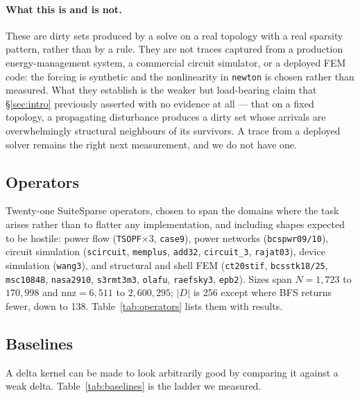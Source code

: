 \documentclass{article}
\begin{document}
\paragraph{What this is and is not.} These are dirty sets produced by a solve on
a real topology with a real sparsity pattern, rather than by a rule. They are
not traces captured from a production energy-management system, a commercial
circuit simulator, or a deployed FEM code: the forcing is synthetic and the
nonlinearity in \texttt{newton} is chosen rather than measured. What they
establish is the weaker but load-bearing claim that \S\ref{sec:intro} previously
asserted with no evidence at all --- that on a fixed topology, a propagating
disturbance produces a dirty set whose arrivals are overwhelmingly structural
neighbours of its survivors. A trace from a deployed solver remains the right
next measurement, and we do not have one.

\subsection{Operators}

Twenty-one SuiteSparse operators, chosen to span the domains where the task
arises rather than to flatter any implementation, and including shapes expected
to be hostile: power flow (\texttt{TSOPF}$\times 3$, \texttt{case9}), power
networks (\texttt{bcspwr09/10}), circuit simulation (\texttt{scircuit},
\texttt{memplus}, \texttt{add32}, \texttt{circuit\_3}, \texttt{rajat03}), device
simulation (\texttt{wang3}), and structural and shell FEM (\texttt{ct20stif},
\texttt{bcsstk18/25}, \texttt{msc10848}, \texttt{nasa2910}, \texttt{s3rmt3m3},
\texttt{olafu}, \texttt{raefsky3}, \texttt{epb2}). Sizes span $N=1{,}723$ to
$170{,}998$ and $\mathrm{nnz}=6{,}511$ to $2{,}600{,}295$; $|D|$ is 256 except
where BFS returns fewer, down to 138. Table~\ref{tab:operators} lists them with
results.

\subsection{Baselines}
\label{sec:baselines}

A delta kernel can be made to look arbitrarily good by comparing it against a
weak delta. Table~\ref{tab:baselines} is the ladder we measured.

\begin{table}[tbp]
  \centering
  \caption{The baseline ladder: geomean ms/step over the ten configurations
  (five operators $\times$ two orderings) for which all rungs were measured,
  $B{=}8$. The benchmark reports against the \emph{bottom} rung. Choosing a rung
  near the top inflates any delta implementation by one to two orders of
  magnitude, and doing so silently is the most common defect we found in our own
  earlier measurements.}
  \label{tab:baselines}
  \small
  
\end{table}
\end{document}
